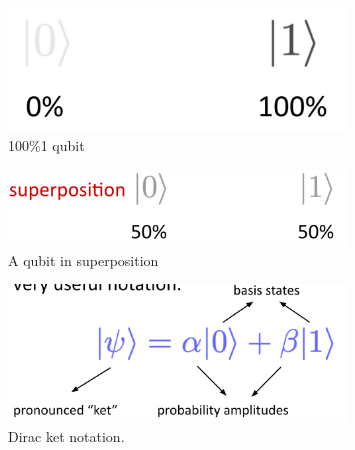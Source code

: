 \begin{figure}[H]
    \centering
    \includegraphics[width=0.8\textwidth]{lesson2/100_1.pdf}
    
        \caption{100\%1 qubit}
    
    \label{fig:100-one}
\end{figure}

\begin{figure}[H]
    \centering
    \includegraphics[width=0.8\textwidth]{lesson2/superposition_qubit.pdf}
    
        \caption{A qubit in superposition}
    
    \label{fig:superpos}
\end{figure}
\fi

\begin{figure}[H]
    \centering
    \includegraphics[width=0.8\textwidth]{lesson2/dirac_notation.pdf}
    
        \caption{Dirac ket notation. }
    
    \label{fig:ket-notation}
\end{figure}

